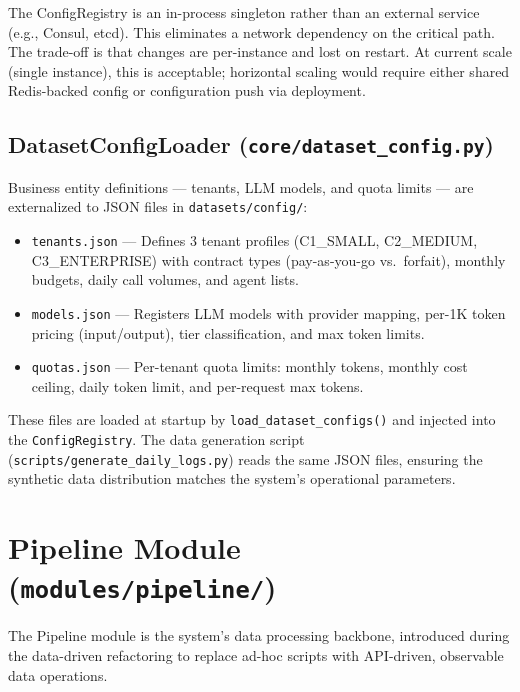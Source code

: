 \documentclass[12pt,a4paper,twoside]{report}
\begin{document}
\begin{designdecision}
The ConfigRegistry is an in-process singleton rather than an external service (e.g., Consul, etcd). This eliminates a network dependency on the critical path. The trade-off is that changes are per-instance and lost on restart. At current scale (single instance), this is acceptable; horizontal scaling would require either shared Redis-backed config or configuration push via deployment.
\end{designdecision}

\subsection{DatasetConfigLoader (\texttt{core/dataset\_config.py})}

Business entity definitions --- tenants, LLM models, and quota limits --- are externalized to JSON files in \texttt{datasets/config/}:

\begin{itemize}
  \item \texttt{tenants.json} --- Defines 3 tenant profiles (C1\_SMALL, C2\_MEDIUM, C3\_ENTERPRISE) with contract types (pay-as-you-go vs.\ forfait), monthly budgets, daily call volumes, and agent lists.
  \item \texttt{models.json} --- Registers LLM models with provider mapping, per-1K token pricing (input/output), tier classification, and max token limits.
  \item \texttt{quotas.json} --- Per-tenant quota limits: monthly tokens, monthly cost ceiling, daily token limit, and per-request max tokens.
\end{itemize}

These files are loaded at startup by \texttt{load\_dataset\_configs()} and injected into the \texttt{ConfigRegistry}. The data generation script (\texttt{scripts/generate\_daily\_logs.py}) reads the same JSON files, ensuring the synthetic data distribution matches the system's operational parameters.

\section{Pipeline Module (\texttt{modules/pipeline/})}
\label{sec:pipeline}

The Pipeline module is the system's data processing backbone, introduced during the data-driven refactoring to replace ad-hoc scripts with API-driven, observable data operations.
\end{document}
